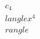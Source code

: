 \documentclass[preview]{standalone}
\begin{document}
\begin{align*}
c_4 \\langle x^4 \\rangle
\end{align*}
\end{document}
